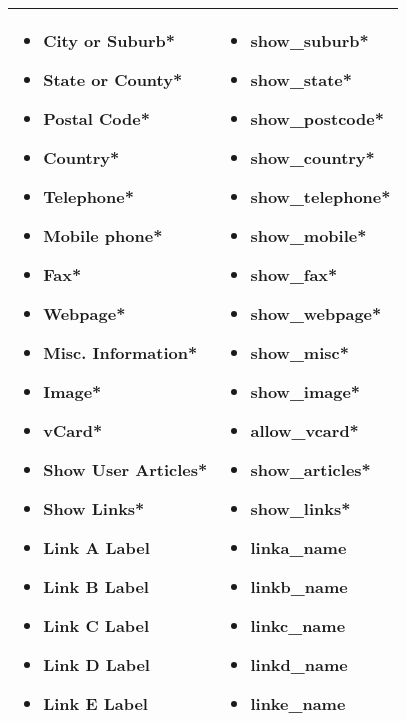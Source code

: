 \begin{minipage}{0.6\textwidth}
\begin{tabular}{|p{} | p{}|}
\hline
\begin{itemize}
\item City or Suburb*
\item State or County* 
\item Postal Code* 
\item Country*
\item Telephone* 
\item Mobile phone* 
\item Fax*
\item Webpage* 
\item Misc. Information* 
\item Image* 
\item vCard* 
\item Show User Articles* 
\item Show Links* 
\item Link A Label 
\item Link B Label 
\item Link C Label 
\item Link D Label 
\item Link E Label
\end{itemize}
 & 
\begin{itemize}
\item show\_suburb* 
\item show\_state* 
\item show\_postcode* 
\item show\_country* 
\item show\_telephone* 
\item show\_mobile* 
\item show\_fax* 
\item show\_webpage* 
\item show\_misc* 
\item show\_image* 
\item allow\_vcard* 
\item show\_articles* 
\item show\_links* 
\item linka\_name 
\item linkb\_name 
\item linkc\_name 
\item linkd\_name 
\item linke\_name
\end{itemize}
\\ \hline
\end{tabular}
\end{minipage}

